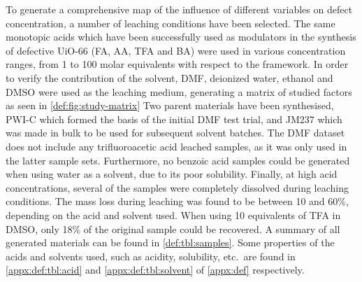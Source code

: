To generate a comprehensive map of the influence
of different variables on defect concentration, a number of
leaching conditions have been selected. The same monotopic acids 
which have been successfully used
as modulators in the synthesis of defective UiO-66
(\gls{FA}, \gls{AA}, \gls{TFA} and \gls{BA}) 
were used in various concentration ranges,
from 1 to 100 molar equivalents with respect to the framework.
In order to verify the contribution of the solvent,
\gls{DMF}, deionized water, ethanol and \gls{DMSO} 
were used as the leaching medium, generating a matrix of 
studied factors as seen in \autoref{def:fig:study-matrix}
Two parent materials have been synthesised, PWI-C which formed 
the basis of the initial \gls{DMF} test trial, and JM237 which 
was made in bulk to be used for subsequent solvent batches.
The \gls{DMF} dataset does not include any trifluoroacetic acid
leached samples, as it was only used in the latter sample sets.
Furthermore, no benzoic acid samples could be generated when using
water as a solvent, due to its poor solubility. Finally, 
at high acid concentrations, several of the samples were completely
dissolved during leaching
conditions. The mass loss during leaching was found to be 
between 10 and 60\%, depending on the acid and solvent used.
When using 10 equivalents of \gls{TFA} in \gls{DMSO}, only 18\% of the 
original sample could be recovered. 
A summary of all generated materials can be found in
\autoref{def:tbl:samples}.
Some properties of the acids and solvents used, such as acidity,
solubility, etc.\ are found in 
\autoref{appx:def:tbl:acid} and \autoref{appx:def:tbl:solvent} of 
\autoref{appx:def} respectively.

